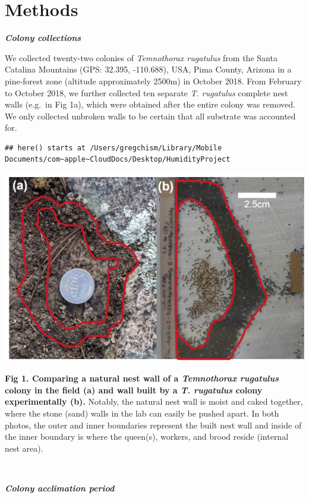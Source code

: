 \documentclass[3p]{elsarticle} %
\begin{document}
\hypertarget{methods}{%
\section{Methods}\label{methods}}

\textbf{\emph{Colony collections}}

We collected twenty-two colonies of \emph{Temnothorax rugatulus} from
the Santa Catalina Mountains (GPS: 32.395, -110.688), USA, Pima County,
Arizona in a pine-forest zone (altitude approximately 2500m) in October
2018. From February to October 2018, we further collected ten separate
\emph{T. rugatulus} complete nest walls (e.g.~in Fig 1a), which were
obtained after the entire colony was removed. We only collected unbroken
walls to be certain that all substrate was accounted for.

\begin{verbatim}
## here() starts at /Users/gregchism/Library/Mobile Documents/com~apple~CloudDocs/Desktop/HumidityProject
\end{verbatim}

\begin{flushleft}\includegraphics[width=0.75\linewidth,height=0.37\textheight]{../figures/Fig1} \end{flushleft}

\textbf{Fig 1. Comparing a natural nest wall of a \emph{Temnothorax
rugatulus} colony in the field (a) and wall built by a \emph{T.
rugatulus} colony experimentally (b).} Notably, the natural nest wall is
moist and caked together, where the stone (sand) walls in the lab can
easily be pushed apart. In both photos, the outer and inner boundaries
represent the built nest wall and inside of the inner boundary is where
the queen(s), workers, and brood reside (internal nest area).

~

\textbf{\emph{Colony acclimation period}}
\end{document}
